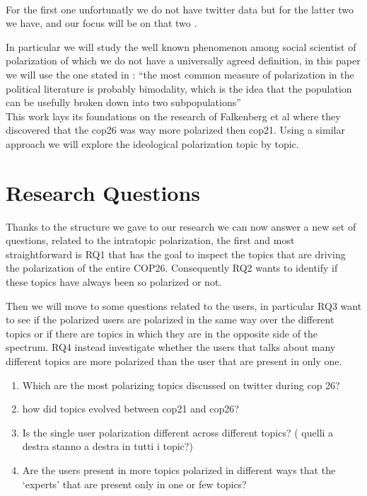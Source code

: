 \\

For the first one unfortunatly we do not have twitter data but for the latter two we have, and our focus will be on that two .

In particular we will study the well known phenomenon among social scientist of polarization of which we do not have a universally agreed definition, in this paper we will use the one stated in \cite{bramson_understanding_2017}: “the most common measure of polarization in the political literature is probably bimodality, which is the idea that the population can be usefully broken down into two subpopulations”\\




This work lays its foundations on the research of Falkenberg et al \cite{falkenberg_growing_2022} where they discovered that the cop26 was way more polarized then cop21. Using a similar approach we will explore the ideological polarization topic by topic. 


\section{Research Questions}
Thanks to the structure we gave to our research we can now answer a new set of questions, related to the intratopic polarization, the first and most straightforward is RQ1 that has the goal to inspect the topics that are driving the polarization of the entire COP26. Consequently RQ2 wants to identify if these topics have always been so polarized or not.

Then we will move to some questions related to the users, in particular RQ3 want to see if the polarized users are polarized in the same way over the different topics or if there are topics in which they are in the opposite side of the spectrum. RQ4 instead investigate whether the users that talks about many different topics are more polarized than the user that are present in only one.



\begin{enumerate}
    \item  Which are the most polarizing topics discussed on twitter during cop 26?
    \item how did topics evolved between cop21 and cop26?
    \item Is the single user polarization different across different topics? ( quelli a destra stanno  a destra in tutti i topic?)
    \item Are the users present in more topics polarized in different ways that the ‘experts’ that are present only in one or few topics?

\end{enumerate}







